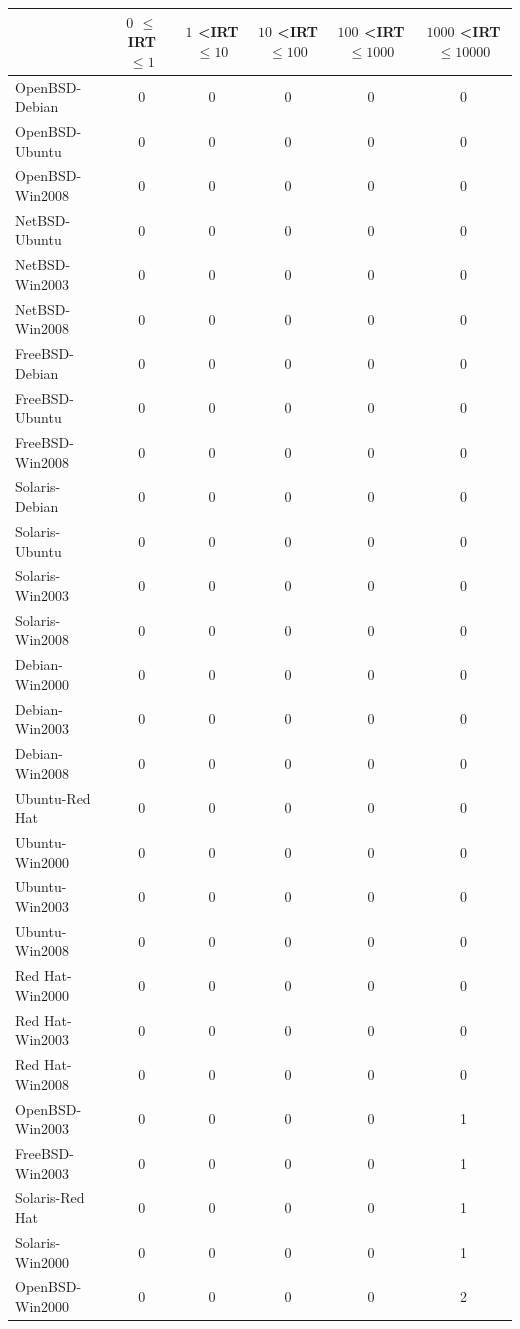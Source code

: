 \begin{table}[!ht]
\begin{center}
{\scriptsize
\begin{tabular}{|l||c c c c c|}\hline
&	$0$ $\leq$ IRT $\leq 1$	& $1$ \textless IRT $\leq 10$ & $10$ \textless IRT $\leq 100$ & $100$ \textless IRT $\leq 1000$ & $1000$ \textless IRT $\leq 10000$\\\hline
OpenBSD-Debian & 0 & 0 & 0 & 0 & 0 \\
OpenBSD-Ubuntu & 0 & 0 & 0 & 0 & 0 \\
OpenBSD-Win2008 & 0 & 0 & 0 & 0 & 0 \\
NetBSD-Ubuntu & 0 & 0 & 0 & 0 & 0 \\
NetBSD-Win2003 & 0 & 0 & 0 & 0 & 0 \\
NetBSD-Win2008 & 0 & 0 & 0 & 0 & 0 \\
FreeBSD-Debian & 0 & 0 & 0 & 0 & 0 \\
FreeBSD-Ubuntu & 0 & 0 & 0 & 0 & 0 \\
FreeBSD-Win2008 & 0 & 0 & 0 & 0 & 0 \\
Solaris-Debian & 0 & 0 & 0 & 0 & 0 \\
Solaris-Ubuntu & 0 & 0 & 0 & 0 & 0 \\
Solaris-Win2003 & 0 & 0 & 0 & 0 & 0 \\
Solaris-Win2008 & 0 & 0 & 0 & 0 & 0 \\
Debian-Win2000 & 0 & 0 & 0 & 0 & 0 \\
Debian-Win2003 & 0 & 0 & 0 & 0 & 0 \\
Debian-Win2008 & 0 & 0 & 0 & 0 & 0 \\
Ubuntu-Red Hat & 0 & 0 & 0 & 0 & 0 \\
Ubuntu-Win2000 & 0 & 0 & 0 & 0 & 0 \\
Ubuntu-Win2003 & 0 & 0 & 0 & 0 & 0 \\
Ubuntu-Win2008 & 0 & 0 & 0 & 0 & 0 \\
Red Hat-Win2000 & 0 & 0 & 0 & 0 & 0 \\
Red Hat-Win2003 & 0 & 0 & 0 & 0 & 0  \\
Red Hat-Win2008 & 0 & 0 & 0 & 0 & 0 \\ \hline
OpenBSD-Win2003 & 0 & 0 & 0 & 0 & 1 \\
FreeBSD-Win2003 & 0 & 0 & 0 & 0 & 1 \\
Solaris-Red Hat & 0 & 0 & 0 & 0 & 1 \\
Solaris-Win2000 & 0 & 0 & 0 & 0 & 1  \\
OpenBSD-Win2000 & 0 & 0 & 0 & 0 & 2 \\ \hline

\end{tabular}}
\end{center}
\end{table}
